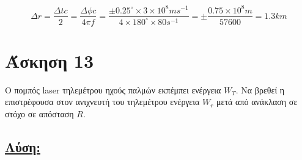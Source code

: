 \documentclass[a4paper,11pt,titlepage]{article}
\newcommand{\degrees}{^{\circ}}
\begin{document}
\begin{equation}
 \Delta r=\frac{\Delta tc}{2}=\frac{\Delta\phi c}{4\pi f}=\frac{\pm 0.25\degrees\times 3\times10^8ms^{-1}}{4\times 180\degrees \times 80s^{-1}}=\pm\frac{0.75\times10^8m}{57600}=1.3km
\end{equation}

\section{Άσκηση 13}

Ο πομπός laser τηλεμέτρου ηχούς παλμών εκπέμπει ενέργεια $W_T$. Να βρεθεί η επιστρέφουσα στον ανιχνευτή του τηλεμέτρου ενέργεια $W_r$ μετά από ανάκλαση σε στόχο σε απόσταση $R$.

\subsection*{\underline{Λύση:}}









\end{document}
